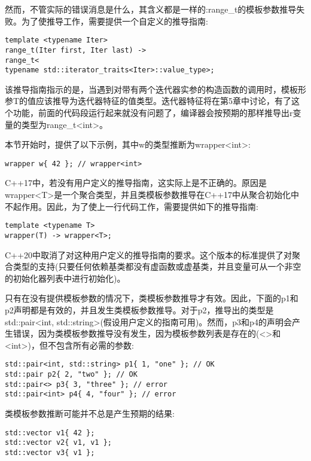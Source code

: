 然而，不管实际的错误消息是什么，其含义都是一样的:range\_t的模板参数推导失败。为了使推导工作，需要提供一个自定义的推导指南:

\begin{lstlisting}[style=styleCXX]
template <typename Iter>
range_t(Iter first, Iter last) ->
range_t<
typename std::iterator_traits<Iter>::value_type>;
\end{lstlisting}

该推导指南指示的是，当遇到对带有两个迭代器实参的构造函数的调用时，模板形参T的值应该推导为迭代器特征的值类型。迭代器特征将在第5章中讨论，有了这个功能，前面的代码段运行起来就没有问题了，编译器会按预期的那样推导出r变量的类型为range\_t<int>。

本节开始时，提供了以下示例，其中w的类型推断为wrapper<int>:

\begin{lstlisting}[style=styleCXX]
wrapper w{ 42 }; // wrapper<int>
\end{lstlisting}

C++17中，若没有用户定义的推导指南，这实际上是不正确的。原因是wrapper<T>是一个聚合类型，并且类模板参数推导在C++17中从聚合初始化中不起作用。因此，为了使上一行代码工作，需要提供如下的推导指南:

\begin{lstlisting}[style=styleCXX]
template <typename T>
wrapper(T) -> wrapper<T>;
\end{lstlisting}

C++20中取消了对这种用户定义的推导指南的要求。这个版本的标准提供了对聚合类型的支持(只要任何依赖基类都没有虚函数或虚基类，并且变量可从一个非空的初始化器列表中进行初始化)。

只有在没有提供模板参数的情况下，类模板参数推导才有效。因此，下面的p1和p2声明都是有效的，并且发生类模板参数推导。对于p2，推导出的类型是std::pair<int, std::string>(假设用户定义的指南可用)。然而，p3和p4的声明会产生错误，因为类模板参数推导没有发生，因为模板参数列表是存在的(<>和<int>)，但不包含所有必需的参数:

\begin{lstlisting}[style=styleCXX]
std::pair<int, std::string> p1{ 1, "one" }; // OK
std::pair p2{ 2, "two" }; // OK
std::pair<> p3{ 3, "three" }; // error
std::pair<int> p4{ 4, "four" }; // error
\end{lstlisting}

类模板参数推断可能并不总是产生预期的结果:

\begin{lstlisting}[style=styleCXX]
std::vector v1{ 42 };
std::vector v2{ v1, v1 };
std::vector v3{ v1 };
\end{lstlisting}

